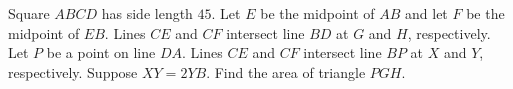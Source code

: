 Square $ABCD$ has side length $45$. Let $E$ be the midpoint of $AB$ and let $F$ be the midpoint of $EB$. Lines $CE$ and $CF$ intersect line $BD$ at $G$ and $H$, respectively. Let $P$ be a point on line $DA$. Lines $CE$ and $CF$ intersect line $BP$ at $X$ and $Y$, respectively. Suppose $XY=2YB$. Find the area of triangle $PGH$.
